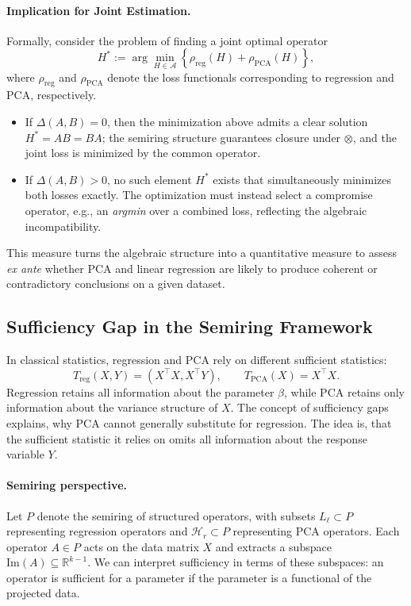 \paragraph{Implication for Joint Estimation.}
Formally, consider the problem of finding a joint optimal operator
\[
H^* := \arg\min_{H \in \mathcal{A}} \left\{ \rho_\mathrm{reg}(H) + \rho_\mathrm{PCA}(H) \right\},
\]
where $\rho_\mathrm{reg}$ and $\rho_\mathrm{PCA}$ denote the loss functionals corresponding to regression and PCA, respectively. 
\begin{itemize}
    \item If $\Delta(A,B) = 0$, then the minimization above admits a clear solution 
          $H^* = AB = BA$; the semiring structure guarantees closure under $\otimes$, and the joint loss is minimized by the common operator.
    \item If $\Delta(A,B) > 0$, no such element $H^*$ exists that simultaneously minimizes both losses exactly. 
          The optimization must instead select a compromise operator, e.g., an \emph{argmin} over a combined loss, reflecting the algebraic incompatibility.
\end{itemize}

This measure turns the algebraic structure into a quantitative measure to assess \emph{ex ante} whether PCA and linear regression are likely to produce coherent or contradictory conclusions on a given dataset. 

\subsection{Sufficiency Gap in the Semiring Framework}

In classical statistics, regression and PCA rely on different sufficient statistics:
\[
T_{\text{reg}}(X,Y) = (X^\top X, X^\top Y), \qquad
T_{\text{PCA}}(X) = X^\top X.
\]
Regression retains all information about the parameter $\beta$, while PCA retains only information about the variance structure of $X$. The concept of sufficiency gaps explains, why PCA cannot generally substitute for regression. The idea is, that the sufficient statistic it relies on omits all information about the response variable $Y$. 

\paragraph{Semiring perspective.}  
Let $P$ denote the semiring of structured operators, with subsets
$L_\ell \subset P$ representing regression operators and
$\mathcal{H}_r \subset P$ representing PCA operators. 
Each operator $A \in P$ acts on the data matrix $X$ and extracts a subspace
\(\mathrm{Im}(A) \subseteq \mathbb{R}^{k-1}\). 
We can interpret sufficiency in terms of these subspaces: an operator is sufficient for a parameter if the parameter is a functional of the projected data.

